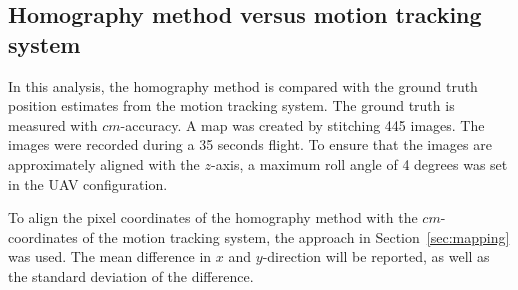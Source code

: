 \subsection{Homography method versus motion tracking system}
\label{sec:siftvsoptitrack}

In this analysis, the homography method is compared with the ground truth position estimates from the motion tracking system. The ground truth is measured with $cm$-accuracy. A map was created by stitching 445 images. The images were recorded during a 35 seconds flight. To ensure that the images are approximately aligned with the $z$-axis, a maximum roll angle of 4 degrees was set in the UAV configuration. 

To align the pixel coordinates of the homography method with the $cm$-coordinates of the motion tracking system, the approach in Section~\ref{sec:mapping} was used. The mean difference in $x$ and $y$-direction will be reported, as well as the standard deviation of the difference. 

